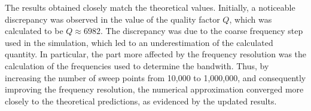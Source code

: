 The results obtained closely match the theoretical values. Initially, a noticeable discrepancy was observed in the value of the quality factor $Q$, which was calculated to be $Q\approx6982$. The discrepancy was due to the coarse frequency step used in the simulation, which led to an underestimation of the calculated quantity. In particular, the part more affected by the frequency resolution was the calculation of the frequencies used to determine the bandwith. Thus, by increasing the number of sweep points from 10,000 to 1,000,000, and consequently improving the frequency resolution, the numerical approximation converged more closely to the theoretical predictions, as evidenced by the updated results.